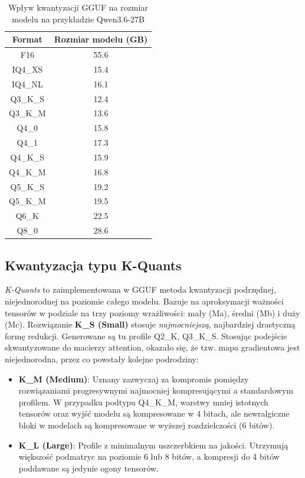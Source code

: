 \begin{table}[h]
    \centering
    \caption{Wpływ kwantyzacji GGUF na rozmiar modelu na przykładzie Qwen3.6-27B}
    \begin{tabular}{|c|c|}
        \hline
        \textbf{Format} & \textbf{Rozmiar modelu (GB)} \\ \hline
        F16 & 55.6 \\ \hline
        IQ4\_XS & 15.4 \\ \hline
        IQ4\_NL & 16.1 \\ \hline
        Q3\_K\_S & 12.4 \\ \hline
        Q3\_K\_M & 13.6 \\ \hline
        Q4\_0 & 15.8 \\ \hline
        Q4\_1 & 17.3 \\ \hline
        Q4\_K\_S & 15.9 \\ \hline
        Q4\_K\_M & 16.8 \\ \hline
        Q5\_K\_S & 19.2 \\ \hline
        Q5\_K\_M & 19.5 \\ \hline
        Q6\_K & 22.5 \\ \hline
        Q8\_0 & 28.6 \\ \hline
    \end{tabular}
\end{table}


\subsection{Kwantyzacja typu K-Quants}
\textit{K-Quants} to zaimplementowana w GGUF metoda kwantyzacji podrzędnej, niejednorodnej na poziomie całego modelu. Bazuje na aproksymacji ważności tensorów w podziale na trzy poziomy wrażliwości: mały (Ma), średni (Mb) i duży (Mc). Rozwiązanie \textbf{K\_S (Small)} stosuje \textit{najmocniejszą}, najbardziej drastyczną formę redukcji. Generowane są tu profile Q2\_K, Q3\_K\_S.
Stosując podejście skwantyzowane do macierzy attention, okazało się, że tzw. mapa gradientowa jest niejednorodna, przez co powstały kolejne podrodziny:
\begin{itemize}
    \item \textbf{K\_M (Medium)}: Uznany zazwyczaj za kompromis pomiędzy rozwiązaniami progresywnymi najmocniej kompresującymi a standardowym profilem. W przypadku podtypu Q4\_K\_M, warstwy mniej istotnych tensorów oraz wyjść modelu są kompresowane w 4 bitach, ale newralgiczne bloki w modelach są kompresowane w wyższej rozdzielczości (6 bitów).
    \item \textbf{K\_L (Large)}: Profile z minimalnym uszczerbkiem na jakości. Utrzymują większość podmatryc na poziomie 6 lub 8 bitów, a kompresji do 4 bitów poddawane są jedynie ogony tensorów.
\end{itemize}

